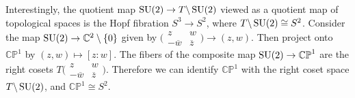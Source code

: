 \documentclass[../../rtnotes.tex]{subfiles}
\begin{document}
Interestingly, the quotient map $\operatorname{SU}(2)\to T\backslash\operatorname{SU}(2)$ viewed as a quotient map of topological spaces is the Hopf fibration $S^3\to S^2$, where $T\backslash\operatorname{SU}(2)\cong S^2$. Consider the map $\operatorname{SU}(2)\to \mathbb C^2\setminus \{0\}$ given by $\bigl(\!\begin{smallmatrix}
    z & w \\ -\overline w & \overline z
\end{smallmatrix}\!\bigr)\to (z,w)$. Then project onto $\mathbb{CP}^1$ by $(z,w)\mapsto [z:w]$. The fibers of the composite map $\operatorname{SU}(2)\to \mathbb{CP}^1$ are the right cosets $T\bigl(\!\begin{smallmatrix}
    z & w \\ -\overline w & \overline z
\end{smallmatrix}\!\bigr)$. Therefore we can identify $\mathbb{CP}^1$ with the right coset space $T\backslash\operatorname{SU}(2)$, and $\mathbb{CP}^1\cong S^2$. 
\end{document}
